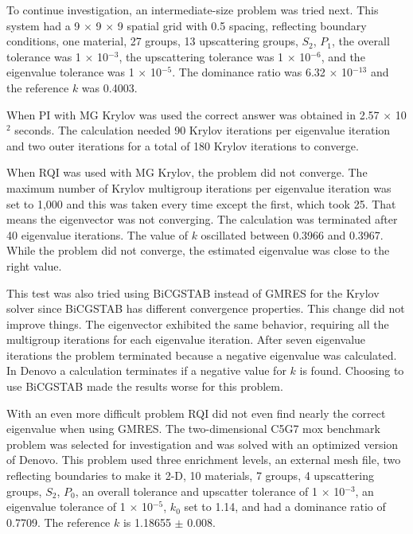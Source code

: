 To continue investigation, an intermediate-size problem was tried next. This system had a 9 $\times$ 9 $\times$ 9 spatial grid with 0.5 spacing, reflecting boundary conditions, one material, 27 groups, 13 upscattering groups, $S_{2}$, $P_{1}$, the overall tolerance was 1 $\times$ 10$^{-3}$, the upscattering tolerance was 1 $\times$ 10$^{-6}$, and the eigenvalue tolerance was 1 $\times$ 10$^{-5}$. The dominance ratio was 6.32 $\times$ 10$^{-13}$ and the reference $k$ was 0.4003. 

When PI with MG Krylov was used the correct answer was obtained in 2.57 $\times$ 10$^{2}$ seconds. The calculation needed 90 Krylov iterations per eigenvalue iteration and two outer iterations for a total of 180 Krylov iterations to converge. 

When RQI was used with MG Krylov, the problem did not converge. The maximum number of Krylov multigroup iterations per eigenvalue iteration was set to 1,000 and this was taken every time except the first, which took 25. That means the eigenvector was not converging. The calculation was terminated after 40 eigenvalue iterations. The value of $k$ oscillated between 0.3966 and 0.3967. While the problem did not converge, the estimated eigenvalue was close to the right value.

This test was also tried using BiCGSTAB instead of GMRES for the Krylov solver since BiCGSTAB has different convergence properties. This change did not improve things. The eigenvector exhibited the same behavior, requiring all the multigroup iterations for each eigenvalue iteration. After seven eigenvalue iterations the problem terminated because a negative eigenvalue was calculated. In Denovo a calculation terminates if a negative value for $k$ is found. Choosing to use BiCGSTAB made the results worse for this problem. 

With an even more difficult problem RQI did not even find nearly the correct eigenvalue when using GMRES. The two-dimensional C5G7 mox benchmark problem \cite{OECD-NEA2003} was selected for investigation and was solved with an optimized version of Denovo. This problem used three enrichment levels, an external mesh file, two reflecting boundaries to make it 2-D, 10 materials, 7 groups, 4 upscattering groups, $S_{2}$, $P_{0}$, an overall tolerance and upscatter tolerance of 1 $\times$ 10$^{-3}$, an eigenvalue tolerance of 1 $\times$ 10$^{-5}$, $k_{0}$ set to 1.14, and had a dominance ratio of 0.7709. The reference $k$ is 1.18655 $\pm$ 0.008.

